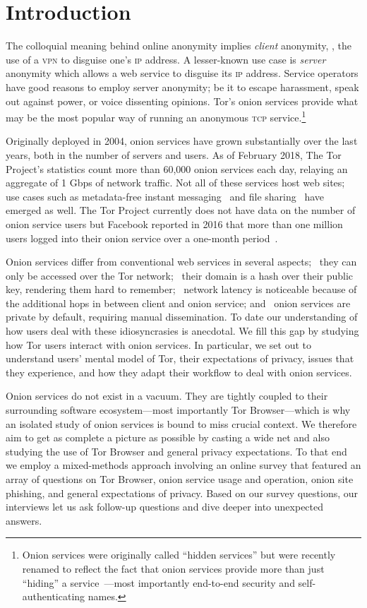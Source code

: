 \section{Introduction}
\label{sec:introduction}

The colloquial meaning behind online anonymity implies \emph{client} anonymity,
\eg, the use of a \textsc{vpn} to disguise one's \textsc{ip} address.  A
lesser-known use case is \emph{server} anonymity which allows a web service to
disguise its \textsc{ip} address.  Service operators have good reasons to employ
server anonymity; be it to escape harassment, speak out against power, or voice
dissenting opinions.  Tor's onion services provide what may be the most popular
way of running an anonymous \textsc{tcp} service.\footnote{Onion services were
originally called ``hidden services'' but were recently renamed to reflect the
fact that onion services provide more than just ``hiding'' a
service~\cite{Johnson2015a}---most importantly end-to-end security and
self-authenticating names.}

Originally deployed in 2004, onion services have grown substantially over the
last years, both in the number of servers and users.  As of February 2018, The
Tor Project's statistics count more than 60,000 onion services each day,
relaying an aggregate of 1 Gbps of network traffic.  Not all of these services
host web sites; use cases such as metadata-free instant
messaging~\cite{ricochet} and file sharing~\cite{onionshare} have emerged as
well.  The Tor Project currently does not have data on the number of onion
service users but Facebook reported in 2016 that more than one million users
logged into their onion service over a one-month period~\cite{facebook-users}.

Onion services differ from conventional web services in several aspects;
\first~they can only be accessed over the Tor network; \second~their domain is a
hash over their public key, rendering them hard to remember; \third~network
latency is noticeable because of the additional hops in between client and onion
service; and \fourth~onion services are private by default, requiring manual
dissemination.  To date our understanding of how users deal with these
idiosyncrasies is anecdotal.  We fill this gap by studying how Tor users
interact with onion services.  In particular, we set out to understand users'
mental model of Tor, their expectations of privacy, issues that they experience,
and how they adapt their workflow to deal with onion services.

Onion services do not exist in a vacuum.  They are tightly coupled to their
surrounding software ecosystem---most importantly Tor Browser---which is why an
isolated study of onion services is bound to miss crucial context.  We therefore
aim to get as complete a picture as possible by casting a wide net and also
studying the use of Tor Browser and general privacy expectations.  To that end
we employ a mixed-methods approach involving an online survey that featured an
array of questions on Tor Browser, onion service usage and operation, onion site
phishing, and general expectations of privacy.  Based on our survey questions,
our interviews let us ask follow-up questions and dive deeper into unexpected
answers.

